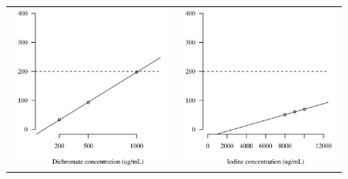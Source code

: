 \documentclass[article,11pt,oneside]{memoir}
\begin{document}
\begin{figure}[p!]
\begin{tabular}{rr}
\includegraphics[scale=0.63]{dichromate}
& \includegraphics[scale=0.63]{iodine} \tabularnewline

\end{tabular}
\end{figure}
\end{document}
